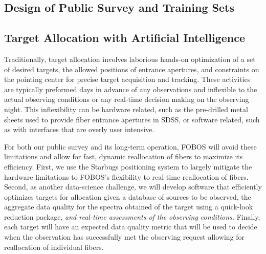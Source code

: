 \documentclass[oneside,11pt]{amsart}
\newcommand{\comment}[2][todo]{{\color{#1}[[{\bf #2}]]}}
\begin{document}
\subsection{Design of Public Survey and Training Sets}
\label{sec:survey}
\noindent \comment{1 page}



\subsection{Target Allocation with Artificial Intelligence}
\label{sec:targeting}
\noindent \comment{1/2 page}

Traditionally, target allocation involves laborious hands-on
optimization of a set of desired targets, the allowed positions of
entrance apertures, and constraints on the pointing center for precise
target acquisition and tracking.  These activities are typically
preformed days in advance of any observations and inflexible to the
actual observing conditions or any real-time decision making on the
observing night.  This inflexibility can be hardware related, such as
the pre-drilled metal sheets used to provide fiber entrance apertures in
SDSS, or software related, such as with interfaces that are overly user
intensive.

For both our public survey and its long-term operation, FOBOS will avoid
these limitations and allow for fast, dynamic reallocation of fibers to
maximize its efficiency.  First, we use the Starbugs positioning system
to largely mitigate the hardware limitations to FOBOS's flexibility to
real-time reallocation of fibers.  Second, as another data-science
challenge, we will develop software that efficiently optimizes targets
for allocation given a database of sources to be observed, the aggregate
data quality for the spectra obtained of the target using a quick-look
reduction package, {\it and real-time assessments of the observing
conditions.}  Finally, each target will have an expected data quality
metric that will be used to decide when the observation has successfully
met the observing request allowing for reallocation of individual
fibers.
\end{document}
